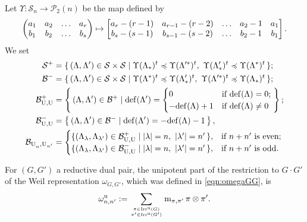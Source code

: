 \documentclass[12pt]{amsart}
\numberwithin{equation}{subsection}
\newcommand{\cP}{\mathcal{P}}
\newcommand{\cS}{\mathcal{S}}
\newcommand{\mult}{\mathrm{m}}
\newcommand{\rU}{\mathrm{U}}
\newcommand{\unip}{\mathrm{u}}
\newcommand{\Irr}{\operatorname{Irr}}
\def\cB{{\mathcal{B}}}
\begin{document}
Let $\Upsilon \colon \cS_n\to\cP_2(n)$ be the map defined by
\begin{equation} \label{eqn:Upsilon}
\left(\begin{matrix} a_1&a_2&\ldots&a_{r}\cr 
b_1&b_2&\ldots&b_{s}\end{matrix}\right)\mapsto
\left[\begin{matrix} a_{r}-(r-1)&a_{r-1}-(r-2)&\ldots&a_2-1&a_1\cr 
b_{s}-(s-1)&b_{s-1}-(s-2)&\ldots &b_2-1&b_1\end{matrix}\right].
\end{equation}
We set
\begin{align*}
\cS^+ &=\{\,(\Lambda,\Lambda')\in\cS\times\cS
\mid\Upsilon(\Lambda_*)^t\preccurlyeq\Upsilon(\Lambda'^*)^t,\ \Upsilon(\Lambda'_*)^t \preccurlyeq\Upsilon(\Lambda^*)^t\,\};\\
\cB^- &=\{\,(\Lambda,\Lambda')\in\cS\times\cS
\mid\Upsilon(\Lambda^*)^t\preccurlyeq\Upsilon(\Lambda'_*)^t,\ \Upsilon(\Lambda'^*)^t\preccurlyeq\Upsilon(\Lambda_*)^t\,\};\\
\cB^+_{\rU,\rU} &=\left\{\,(\Lambda,\Lambda')\in\cB^+\mid
{\rm def}(\Lambda')=\begin{cases}
0& \text{if ${\rm def}(\Lambda)=0$};\\
-{\rm def}(\Lambda)+1 & \text{if ${\rm def}(\Lambda)\neq 0$}
\end{cases}\,\right\};\\
\cB^-_{\rU,\rU} &=\left\{\,(\Lambda,\Lambda')\in\cB^-\mid
{\rm def}(\Lambda')=-{\rm def}(\Lambda)-1\,\right\},\\
\cB_{\rU_{\vphantom{n'}n},\rU_{n'}} &=
\begin{cases}
\{(\Lambda_\lambda,\Lambda_{\lambda'})\in\cB^+_{\rU,\rU}\mid |\lambda|=n,\ |\lambda'|=n'\,\}, & \text{if $n+n'$ is even};\\
\{(\Lambda_\lambda,\Lambda_{\lambda'})\in\cB^-_{\rU,\rU}\mid|\lambda|=n,\ |\lambda'|=n'\,\}, & \text{if $n+n'$ is odd}.
\end{cases}
\end{align*}

For $(G,G')$ a reductive dual pair,  the unipotent part of  the restriction to $G\cdot G'$ of the Weil representation $\omega_{G,G'}$, which was defined in \eqref{eqn:omegaGG}, is
\begin{equation}
\omega_{n,n'}^{\unip}:=\sum_{\pi\in\Irr^{\unip}(G)\atop\pi'\in\Irr^{\unip}(G')}\mult_{\pi,\pi'}\,\pi\otimes\pi'.
\end{equation}
\end{document}
